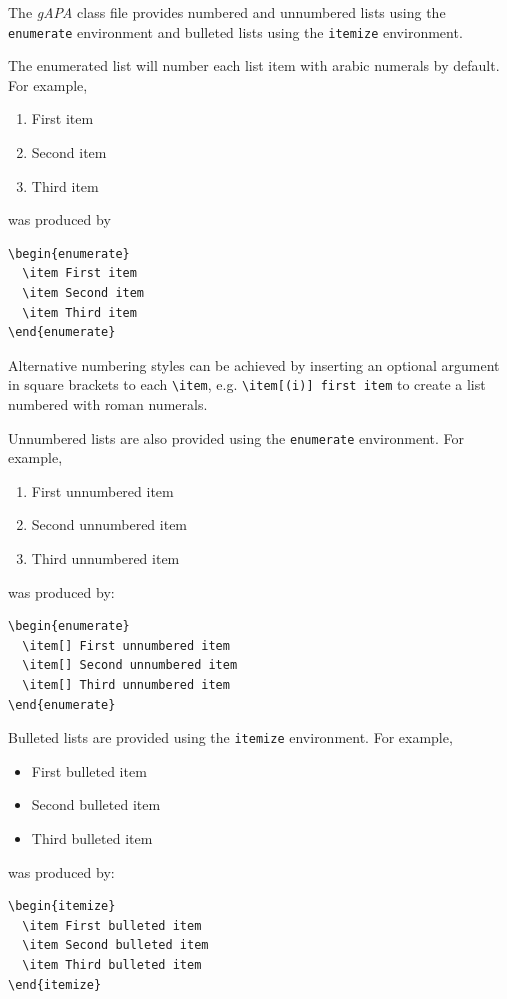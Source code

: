 \documentclass{gAPA2e}
\theoremstyle{plain}
\theoremstyle{remark}
\theoremstyle{definition}
\begin{document}
The {\it gAPA} class file provides numbered and unnumbered lists using the {\tt enumerate} environment and bulleted
lists  using the {\tt itemize} environment.

The enumerated list will number each list item with arabic numerals by default. For example,
%
\begin{enumerate}
  \item First item
  \item Second item
  \item Third item
\end{enumerate}
%
was produced by
%
\begin{verbatim}
\begin{enumerate}
  \item First item
  \item Second item
  \item Third item
\end{enumerate}
\end{verbatim}
%
Alternative numbering styles can be achieved by inserting an optional argument in square brackets to each \verb"\item", e.g. \verb"\item[(i)] first item" to create a list numbered with roman numerals.

Unnumbered lists are also provided using the {\tt enumerate} environment. For example,
%
\begin{enumerate}
  \item[] First unnumbered item
  \item[] Second unnumbered item
  \item[] Third unnumbered item
\end{enumerate}
%
was produced by:
%
\begin{verbatim}
\begin{enumerate}
  \item[] First unnumbered item
  \item[] Second unnumbered item
  \item[] Third unnumbered item
\end{enumerate}
\end{verbatim}

Bulleted lists are provided using the {\tt itemize} environment. For example,
%
\begin{itemize}
  \item First bulleted item
  \item Second bulleted item
  \item Third bulleted item
\end{itemize}
%
was produced by:
%
\begin{verbatim}
\begin{itemize}
  \item First bulleted item
  \item Second bulleted item
  \item Third bulleted item
\end{itemize}
\end{verbatim}
\end{document}
